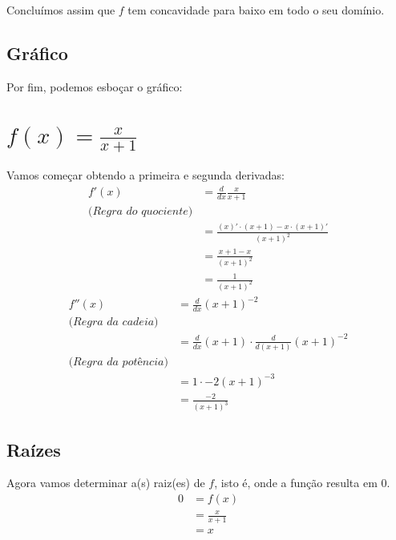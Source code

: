 \documentclass[12pt]{article}
\theoremstyle{definition}
\begin{document}
Concluímos assim que \(f\) tem concavidade para baixo em todo o seu domínio.
\subsection{Gráfico}
Por fim, podemos esboçar o gráfico:


\section{\(f(x) = \frac{x}{x+1}\)}
Vamos começar obtendo a primeira e segunda derivadas:
\begin{align*}
    f'(x)
    &= \frac{d}{dx}\frac{x}{x+1} \\
    \textit{(Regra do quociente)} \\
    &= \frac{(x)'\cdot (x+1) - x \cdot (x+1)'}{{(x+1)}^2} \\
    &= \frac{x+1-x}{{(x+1)}^2} \\
    &= \frac{1}{{(x+1)}^2}
\end{align*}
\begin{align*}
    f''(x)
    &= \frac{d}{dx}{(x+1)}^{-2} \\
    \textit{(Regra da cadeia)} \\
    &= \frac{d}{dx}(x+1) \cdot \frac{d}{d(x+1)}{(x+1)}^{-2} \\
    \textit{(Regra da potência)} \\
    &= 1 \cdot -2{(x+1)}^{-3} \\
    &= \frac{-2}{{(x+1)}^3}
\end{align*}
\subsection{Raízes}
Agora vamos determinar a(s) raiz(es) de \(f\), isto é, onde a função resulta em \(0\).
\begin{align*}
    0
    &= f(x) \\
    &= \frac{x}{x+1} \\
    &= x
\end{align*}
\end{document}
